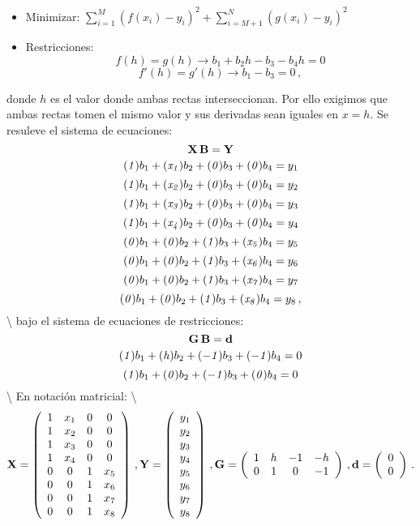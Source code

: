 \documentclass[
]{agujournal2019}
\begin{document}
\begin{itemize}
\item Minimizar:  $\sum\limits^M_{i=1}(f(x_i)-y_i)^2 + \sum\limits^N_{i=M+1}(g(x_i)-y_i)^2$
\item Restricciones:
      $$f(h)=g(h)\rightarrow b_1+b_2 h - b_3 -b_4 h=0$$
      $$f'(h)=g'(h)\rightarrow b_1          - b_3           =0\,,$$
\end{itemize}

donde \(h\) es el valor donde ambas rectas interseccionan. Por ello
exigimos que ambas rectas tomen el mismo valor y sus derivadas sean
iguales en \(x=h\). Se resuleve el sistema de ecuaciones:
\[{\textbf X}\,{\textbf B}={\textbf Y}\]
\[({\it 1})b_1+({\it x_1})b_2 + ({\it 0})b_3 + ({\it 0})b_4=y_1\]
\[({\it 1})b_1+({\it x_2})b_2 + ({\it 0})b_3 + ({\it 0})b_4=y_2\]
\[({\it 1})b_1+({\it x_3})b_2 + ({\it 0})b_3 + ({\it 0})b_4=y_3\]
\[({\it 1})b_1+({\it x_4})b_2 + ({\it 0})b_3 + ({\it 0})b_4=y_4\]
\[({\it 0})b_1+({\it 0})b_2 + ({\it 1})b_3 + ({\it x_5})b_4=y_5\]
\[({\it 0})b_1+({\it 0})b_2 + ({\it 1})b_3 + ({\it x_6})b_4=y_6\]
\[({\it 0})b_1+({\it 0})b_2 + ({\it 1})b_3 + ({\it x_7})b_4=y_7\]
\[({\it 0})b_1+({\it 0})b_2 + ({\it 1})b_3 + ({\it x_8})b_4=y_8\,,\]
\textbackslash{} bajo el sistema de ecuaciones de restricciones:
\[{\textbf G}\,{\textbf B}={\textbf d}\]
\[({\it 1})b_1+({\it h})b_2 + (-{\it 1})b_3 + (-{\it 1})b_4=0\]
\[({\it 1})b_1+({\it 0})b_2 + (-{\it 1})b_3 + ({\it 0})b_4=0\]
\textbackslash{} En notación matricial: \textbackslash{}
\[{\textbf X}=\left(\begin{array}{cccccccc}
  1 & x_1  & 0 & 0 \\
  1 & x_2   & 0 & 0 \\
  1 & x_3   & 0 & 0\\
  1 & x_4   & 0 & 0 \\
  0 & 0  & 1 & x_5 \\
  0 & 0   & 1 & x_6 \\
  0 & 0   & 1 & x_7\\
  0 & 0   & 1 & x_8 \\
  \end{array}\right)\,,
{\textbf Y}=\left(\begin{array}{c}
    y_1 \\ y_2 \\ y_3 \\ y_4 \\ y_5\\ y_6\\y_7\\y_8
      \end{array}\right)\,,
{\textbf G}=\left(\begin{array}{cccccccc}
        1 & h & -1&-h\\
        0 & 1& 0&-1\\
          \end{array}\right)\,,
{\textbf d}=\left(\begin{array}{c}
            0\\
            0\\
              \end{array}\right)\,.
  \]
\end{document}

